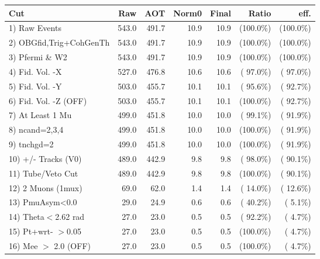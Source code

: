  \begin{table}[h!]\centering
 \begin{tabular}{||l||r|r|r|r|r|r||}
 \hline
 \hline
 Cut & Raw & AOT & Norm0 & Final & Ratio & eff.       \\
 \hline
  1) Raw Events           &        543.0 &        491.7 &         10.9 &         10.9 & (100.0\%) & (100.0\%) \\
  2) OBGfid,Trig+CohGenTh &        543.0 &        491.7 &         10.9 &         10.9 & (100.0\%) & (100.0\%) \\
  3) Pfermi \& W2         &        543.0 &        491.7 &         10.9 &         10.9 & (100.0\%) & (100.0\%) \\
  4) Fid. Vol. -X         &        527.0 &        476.8 &         10.6 &         10.6 & ( 97.0\%) & ( 97.0\%) \\
  5) Fid. Vol. -Y         &        503.0 &        455.7 &         10.1 &         10.1 & ( 95.6\%) & ( 92.7\%) \\
  6) Fid. Vol. -Z (OFF)   &        503.0 &        455.7 &         10.1 &         10.1 & (100.0\%) & ( 92.7\%) \\
  7) At Least 1 Mu        &        499.0 &        451.8 &         10.0 &         10.0 & ( 99.1\%) & ( 91.9\%) \\
  8) ncand=2,3,4          &        499.0 &        451.8 &         10.0 &         10.0 & (100.0\%) & ( 91.9\%) \\
  9) tnchgd=2             &        499.0 &        451.8 &         10.0 &         10.0 & (100.0\%) & ( 91.9\%) \\
 10) +/- Tracks (V0)      &        489.0 &        442.9 &          9.8 &          9.8 & ( 98.0\%) & ( 90.1\%) \\
 11) Tube/Veto Cut        &        489.0 &        442.9 &          9.8 &          9.8 & (100.0\%) & ( 90.1\%) \\
 12) 2 Muons (1mux)       &         69.0 &         62.0 &          1.4 &          1.4 & ( 14.0\%) & ( 12.6\%) \\
 13) PmuAsym<0.0          &         29.0 &         24.9 &          0.6 &          0.6 & ( 40.2\%) & (  5.1\%) \\
 14) Theta$<$2.62 rad     &         27.0 &         23.0 &          0.5 &          0.5 & ( 92.2\%) & (  4.7\%) \\
 15) Pt+wrt- $>$0.05      &         27.0 &         23.0 &          0.5 &          0.5 & (100.0\%) & (  4.7\%) \\
 16) Mee $>$ 2.0  (OFF)   &         27.0 &         23.0 &          0.5 &          0.5 & (100.0\%) & (  4.7\%) \\

\end{tabular}
\end{table}
